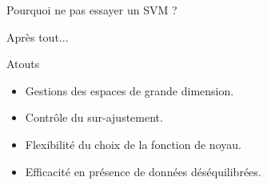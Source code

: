 \documentclass[compress,xcolor=table]{beamer}
\begin{document}
\begin{frame}{Pourquoi ne pas essayer un SVM ?}

    Après tout...

    \begin{block}{Atouts}
        \begin{itemize}
            \item Gestions des espaces de grande dimension.
            \item Contrôle du sur-ajustement.
            \item Flexibilité du choix de la fonction de noyau.
            \item Efficacité en présence de données déséquilibrées.
        \end{itemize}
    \end{block}

\end{frame}








\end{document}
